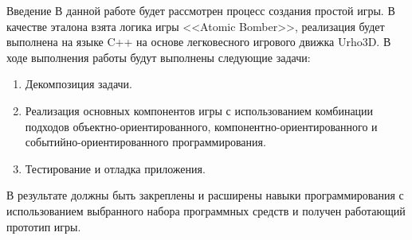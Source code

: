 \usepackage{graphicx}





	

	\tableofcontents

	\begin{anonsection}{Введение}
		В данной работе будет рассмотрен процесс создания простой игры.
		В качестве эталона взята логика игры <<Atomic Bomber>>, реализация будет выполнена на языке C++ на основе легковесного игрового движка Urho3D.
		В ходе выполнения работы будут выполнены следующие задачи:
		\begin{enumerate}
			\item Декомпозиция задачи.
			\item Реализация основных компонентов игры с использованием комбинации подходов объектно-ориентированного, компонентно-ориентированного и событийно-ориентированного программирования.
			\item Тестирование и отладка приложения.
		\end{enumerate}

		В результате должны быть закреплены и расширены навыки программирования с использованием выбранного набора программных средств и получен работающий прототип игры.

	\end{anonsection}

